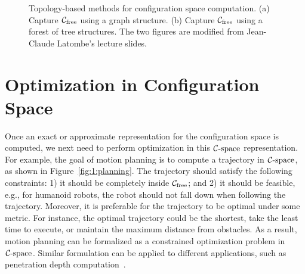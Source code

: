 \begin{figure}[htb]
  \centering
  \caption[Topology-based methods for configuration space computation]{Topology-based methods for configuration space computation. (a) Capture $\mathcal C_{\text{free}}$ using a graph structure. (b) Capture $\mathcal C_{\text{free}}$ using a forest of tree structures. The two figures are modified from Jean-Claude Latombe's lecture slides.}\label{fig:1:topologycspace}
\end{figure}




\section{Optimization in Configuration Space}
\label{sec:1:optimization}
Once an exact or approximate representation for the configuration space is computed, we next need to perform optimization in this $\mathcal C\text{-space}$ representation. For example, the goal of motion planning is to compute a trajectory in $\mathcal C\text{-space}$, as shown in Figure~\ref{fig:1:planning}. The trajectory should satisfy the following constraints: 1) it should be completely inside $\mathcal C_{\text{free}}$; and 2) it should be feasible, e.g., for humanoid robots, the robot should not fall down when following the trajectory. Moreover, 
it is preferable for the trajectory to be optimal under some metric. For instance, the optimal trajectory could be the shortest, take the least time to execute, or maintain the maximum distance from obstacles.
As a result, motion planning can be formalized as a constrained optimization problem in $\mathcal C\text{-space}$. Similar formulation can be applied to different applications, such as penetration depth computation~\cite{Zhang:2007:GPD,Zhang:2007:AFP,Zhang:2008:ICRA,Je:2012:PRP}.


